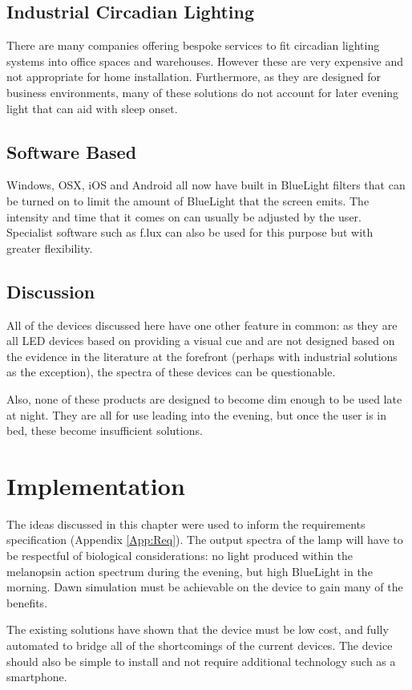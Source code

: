 \subsection{Industrial Circadian Lighting}

There are many companies offering bespoke services to fit circadian lighting systems into office spaces and warehouses. However these are very expensive and not appropriate for home installation. Furthermore, as they are designed for business environments, many of these solutions do not account for later evening light that can aid with sleep onset.

\subsection{Software Based}

Windows, OSX, iOS and Android all now have built in \gls{BlueLight} filters that can be turned on to limit the amount of \gls{BlueLight} that the screen emits. The intensity and time that it comes on can usually be adjusted by the user. Specialist software such as f.lux can also be used for this purpose but with greater flexibility.

\subsection{Discussion}

All of the devices discussed here have one other feature in common: as they are all LED devices based on providing a visual cue and are not designed based on the evidence in the literature at the forefront (perhaps with industrial solutions as the exception), the spectra of these devices can be questionable.

Also, none of these products are designed to become dim enough to be used late at night. They are all for use leading into the evening, but once the user is in bed, these become insufficient solutions.

\section{Implementation}

The ideas discussed in this chapter were used to inform the requirements specification (Appendix \ref{App:Req}). The output spectra of the lamp will have to be respectful of biological considerations: no light produced within the melanopsin action spectrum during the evening, but high \gls{BlueLight} in the morning. Dawn simulation must be achievable on the device to gain many of the benefits.

The existing solutions have shown that the device must be low cost, and fully automated to bridge all of the shortcomings of the current devices. The device should also be simple to install and not require additional technology such as a smartphone.
